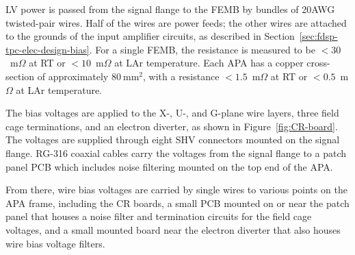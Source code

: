 LV power is passed from the signal flange to the FEMB by bundles of
20AWG twisted-pair wires. Half of the wires are power feeds; the other wires
are attached to the grounds of the input amplifier circuits, as described in Section~\ref{sec:fdsp-tpc-elec-design-bias}.
For a single FEMB, the resistance is measured to be $<30$~m$\Omega$ at RT or $<10$~m$\Omega$ at 
LAr temperature. Each APA has a copper cross-section of approximately $80~\mathrm{mm}^2$, with a 
resistance $<1.5$~m$\Omega$ at RT or $<0.5$~m$\Omega$ at LAr temperature.

The bias voltages are applied to the X-, U-, and G-plane wire layers, three field cage terminations, 
and an electron diverter, as shown in Figure~\ref{fig:CR-board}. The voltages are supplied 
through eight SHV connectors mounted on the signal flange. RG-316 coaxial cables carry the voltages 
from the signal flange to a patch panel PCB which includes noise filtering mounted on the top 
end of the APA. 

From there, wire bias voltages are carried by single wires to 
various points on the APA frame, including the CR boards, a small PCB mounted on or near 
the patch panel that houses a noise filter and termination circuits for the field cage voltages, and 
a small mounted board near the electron diverter that also houses wire bias voltage filters.
